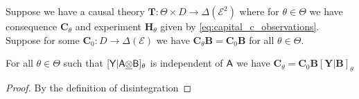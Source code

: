 


\begin{theorem}\label{th:inv_ci}
 Suppose we have a causal theory $\mathbf{T}:\Theta\times D\to \Delta(\mathcal{E}^2)$ where for $\theta\in \Theta$ we have consequence $\mathbf{C}_\theta$ and experiment $\mathbf{H}_\theta$ given by \ref{eq:capital_c_observations}. Suppose for some $\mathbf{C}_0:D\to \Delta(\mathcal{E})$ we have $\mathbf{C}_\theta \mathbf{B} = \mathbf{C}_0 \mathbf{B}$ for all $\theta\in \Theta$.

 For all $\theta\in \Theta$ such that $[\mathsf{Y}|\mathsf{A}\underline{\otimes}\mathsf{B}]_{\theta}$ is independent of $\mathsf{A}$ we have $\mathbf{C}_{\theta} =\mathbf{C}_0 \mathbf{B} [\mathbf{Y|B}]_{\theta}$
\end{theorem}

\begin{proof}
By the definition of disintegration


\end{proof}

